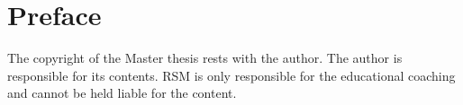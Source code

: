 \documentclass[a4paper,oneside]{memoir}
\date{\today}	%
\author{\me}
\title{\doctitle}
\begin{document}
\frontmatter
{\linespread{1} }
\chapter{Preface}
The copyright of the Master thesis rests with the author. The author is
responsible for its contents. RSM is only responsible for the educational
coaching and cannot be held liable for the content.

\newpage

\newpage

\begin{Spacing}{1.25}
	\small
	\tableofcontents
	\newpage
	\listoffigures
	\listoftables
\end{Spacing}

\mainmatter











\backmatter


\end{document}
